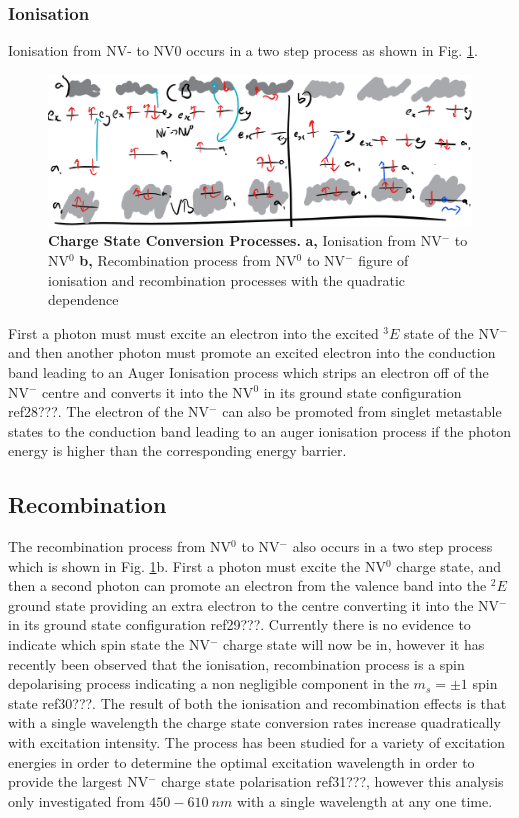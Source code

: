 \documentclass[preprint,prl]{revtex4}
\begin{document}
\subsubsection{Ionisation}
Ionisation from NV- to NV0 occurs in a two step process as shown in Fig. \ref{FigChargeConversion}.

\begin{figure}[H]
  \centering
  \includegraphics[width=1\textwidth]{ChargeConversion.png} 
 \caption{\textbf{Charge State Conversion Processes.} \textbf{a,} Ionisation from NV$^-$ to NV$^0$ \textbf{b,} Recombination process from NV$^0$ to NV$^-$ figure of ionisation and recombination processes with the quadratic dependence} \label{FigChargeConversion}
\end{figure}

First a photon must must excite an electron into the excited $^3E$ state of the NV$^-$ and then another photon must promote an excited electron into the conduction band leading to an Auger Ionisation process which strips an electron off of the NV$^-$ centre and converts it into the NV$^0$ in its ground state configuration ref28???. The electron of the NV$^-$ can also be promoted from singlet metastable states to the conduction band leading to an auger ionisation process if the photon energy is higher than the corresponding energy barrier.

\subsection{Recombination}
The recombination process from NV$^0$ to NV$^-$ also occurs in a two step process which is shown in Fig. \ref{FigChargeConversion}b. First a photon must excite the NV$^0$ charge state, and then a second photon can promote an electron from the valence band into the $^2E$ ground state providing an extra electron to the centre converting it into the NV$^-$ in its ground state configuration ref29???. Currently there is no evidence to indicate which spin state the NV$^-$ charge state will now be in, however it has recently been observed that the ionisation, recombination process is a spin depolarising process indicating a non negligible component in the $m_s=\pm1$ spin state ref30???. The result of both the ionisation and recombination effects is that with a single wavelength the charge state conversion rates increase quadratically with excitation intensity. The process has been studied for a variety of excitation energies in order to determine the optimal excitation wavelength in order to provide the largest NV$^-$ charge state polarisation ref31???, however this analysis only investigated from $\SI{450}-\SI{610}{nm}$ with a single wavelength at any one time.
\end{document}
